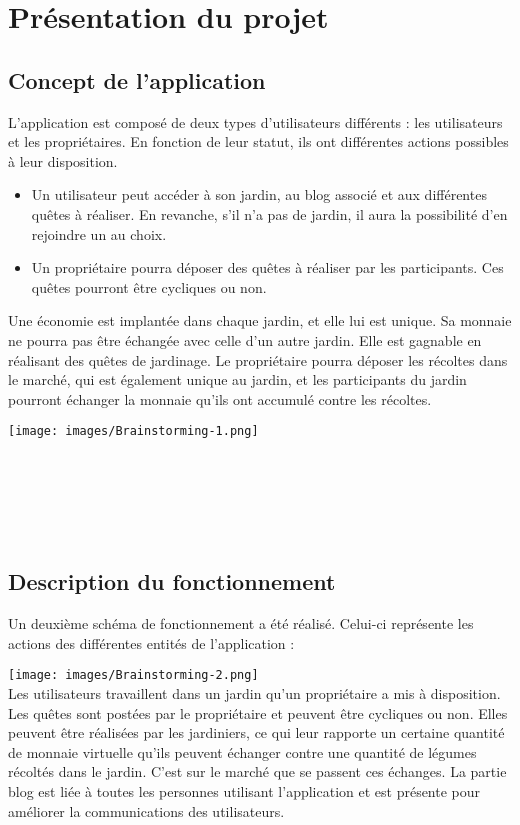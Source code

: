 \documentclass{report}
\begin{document}
\chapter{Présentation du projet}
\section{Concept de l'application}

L'application est composé de deux types d'utilisateurs différents : les utilisateurs et les propriétaires. En fonction de leur statut, ils ont différentes actions possibles à leur disposition. 
\begin{itemize}
    \item Un utilisateur peut accéder à son jardin, au blog associé et aux différentes quêtes à réaliser. En revanche, s'il n'a pas de jardin, il aura la possibilité d'en rejoindre un au choix.
    \item Un propriétaire pourra déposer des quêtes à réaliser par les participants. Ces quêtes pourront être cycliques ou non.
\end{itemize}
Une économie est implantée dans chaque jardin, et elle lui est unique. Sa monnaie ne pourra pas être échangée avec celle d'un autre jardin. Elle est gagnable en réalisant des quêtes de jardinage. 
Le propriétaire pourra déposer les récoltes dans le marché, qui est également unique au jardin, et les participants du jardin pourront échanger la monnaie qu'ils ont accumulé contre les récoltes. 
\begin{center}
   \texttt{[image: images/Brainstorming-1.png]}\\\\\\\\\\\
\end{center}

\section{Description du fonctionnement}

Un deuxième schéma de fonctionnement a été réalisé. Celui-ci représente les actions des différentes entités de l'application :

\texttt{[image: images/Brainstorming-2.png]}\\

Les utilisateurs travaillent dans un jardin qu'un propriétaire a mis à disposition.
Les quêtes sont postées par le propriétaire et peuvent être cycliques ou non. Elles peuvent être réalisées par les jardiniers, ce qui leur rapporte un certaine quantité de monnaie virtuelle qu'ils peuvent échanger contre une quantité de légumes récoltés dans le jardin. C'est sur le marché que se passent ces échanges.
La partie blog est liée à toutes les personnes utilisant l'application et est présente pour améliorer la communications des utilisateurs.
\newpage
\end{document}
